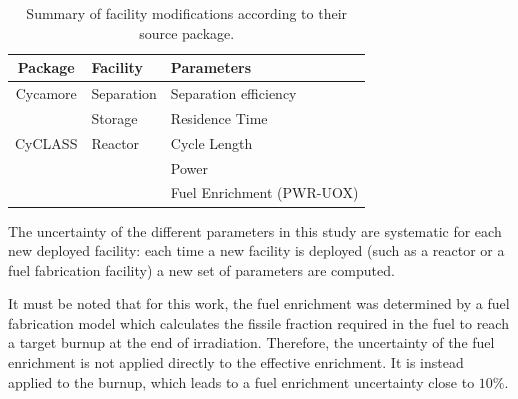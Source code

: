 \documentclass{anstrans}
\begin{document}
\begin{table}[htb]
\centering
  \caption{Summary of facility modifications according to their source package.}
\begin{tabular}{cll}
\toprule

Package   & Facility   & Parameters                \\
\midrule
Cycamore & Separation & Separation efficiency     \\
         & Storage    & Residence Time            \\
\midrule
CyCLASS  & Reactor    & Cycle Length              \\
         &            & Power                     \\
         &            & Fuel Enrichment (PWR-UOX) \\

\bottomrule
\end{tabular}

  \label{tab:package_uncertainty}
\end{table}

The uncertainty of the different parameters in this study
are systematic for each new deployed facility: each time a new facility is
deployed (such as a reactor or a fuel fabrication facility) a new set of
parameters are computed.

It must be noted that for this work, the fuel enrichment was determined by a
fuel fabrication model\cite{Leniau2015125} which
calculates the fissile fraction required in the fuel to reach a target
burnup at the end of irradiation.  Therefore, the uncertainty of the fuel
enrichment is not applied directly to the effective enrichment. It is instead applied to the
burnup, which leads to a fuel enrichment uncertainty close to
$10\%$.
\end{document}
